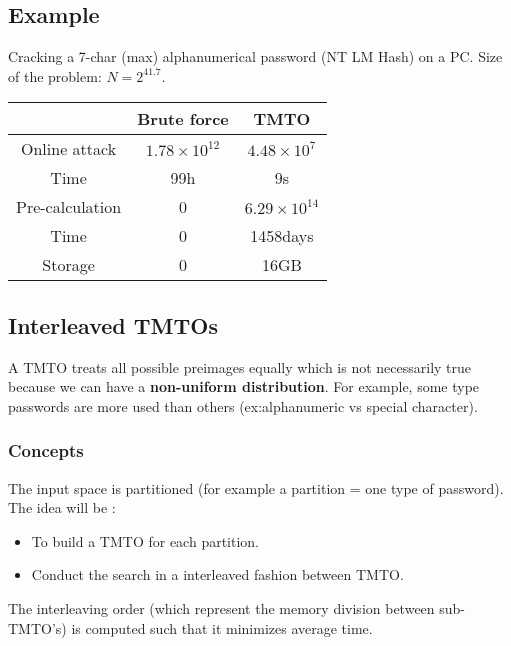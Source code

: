 \subsection{Example}
Cracking a 7-char (max) alphanumerical password (NT LM Hash)
on a PC. Size of the problem: $N = 2^{41.7}$.

\begin{center}
\begin{tabular}{|c|c|c|}
    \hline
    & \textbf{Brute force} & \textbf{TMTO} \\
    \hline
    Online attack & $1.78 \times 10^{12}$ &  $4.48 \times 10^7$\\
    Time & 99h & 9s\\
    \hline
    Pre-calculation & 0 & $6.29 \times 10^{14}$\\
    Time & 0 & 1458days \\
    Storage & 0 & 16GB \\
    \hline
\end{tabular}
\end{center}

\subsection{Interleaved TMTOs}
A TMTO treats all possible preimages equally which is not necessarily
true because we can have a \textbf{non-uniform distribution}. For
example, some type passwords are more used than others
(ex:alphanumeric vs special character).

\subsubsection{Concepts}
The input space is partitioned (for example a partition = one type of password).
The idea will be :
\begin{itemize}
	\item To build a TMTO for each partition.
	\item Conduct the search in a interleaved fashion between TMTO.
\end{itemize}

The interleaving order (which represent the memory division between
sub-TMTO's) is computed such that it minimizes average time.

